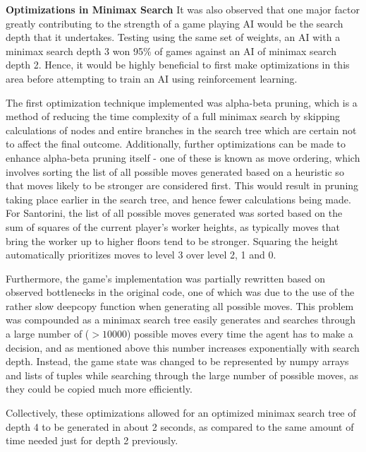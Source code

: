 \documentclass[a4paper,12pt,table]{article}
\begin{document}
\textbf{Optimizations in Minimax Search}
\newline
It was also observed that one major factor greatly contributing to the strength of a game playing AI would be the search depth that it undertakes. Testing using the same set of weights, an AI with a minimax search depth 3 won 95\% of games against an AI of minimax search depth 2. Hence, it would be highly beneficial to first make optimizations in this area before attempting to train an AI using reinforcement learning. \par

The first optimization technique implemented was alpha-beta pruning, which is a method of reducing the time complexity of a full minimax search by skipping calculations of nodes and entire branches in the search tree which are certain not to affect the final outcome. Additionally, further optimizations can be made to enhance alpha-beta pruning itself - one of these is known as move ordering, which involves sorting the list of all possible moves generated based on a heuristic so that moves likely to be stronger are considered first. This would result in pruning taking place earlier in the search tree, and hence fewer calculations being made. For Santorini, the list of all possible moves generated was sorted based on the sum of squares of the current player’s worker heights, as typically moves that bring the worker up to higher floors tend to be stronger. Squaring the height automatically prioritizes moves to level 3 over level 2, 1 and 0. \par

Furthermore, the game’s implementation was partially rewritten based on observed bottlenecks in the original code, one of which was due to the use of the rather slow deepcopy function when generating all possible moves. This problem was compounded as a minimax search tree easily generates and searches through a large number of ($>10000$) possible moves every time the agent has to make a decision, and as mentioned above this number increases exponentially with search depth. Instead, the game state was changed to be represented by numpy arrays and lists of tuples while searching through the large number of possible moves, as they could be copied much more efficiently. \par

Collectively, these optimizations allowed for an optimized minimax search tree of depth 4 to be generated in about 2 seconds, as compared to the same amount of time needed just for depth 2 previously. \par
\end{document}
